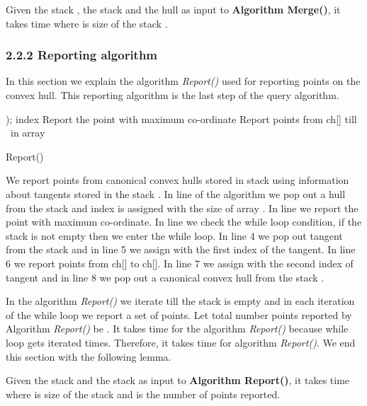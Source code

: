 \documentclass[runningheads,a4paper]{llncs}
\begin{document}
\begin{lemma}\label{lem2}
Given the stack , the stack  and the hull  as input to {\bf Algorithm Merge()}, it takes 
 time where  is size of the stack .
\end{lemma}

\subsubsection{2.2.2  Reporting algorithm}\label{putting}
In this section we explain the algorithm \emph{Report()} used for reporting
points on the convex hull.  This reporting algorithm is the last step of the
query algorithm.
\begin{algorithm}\label{reporting}
);
index \;
Report the point  with maximum  co-ordinate\;
Report points from  ch[] till \ in array \;
\caption{Report()}
\end{algorithm}
\vspace{-0.7cm}
We report points from canonical convex hulls stored in
stack  using information about tangents stored in the stack .
In line  of the algorithm we pop out a hull from the stack  and index 
is assigned with the size of array . In line  we report the point  with maximum  co-ordinate.
In line  we check the while loop condition, if the stack is not empty then we enter the while loop.  In line 4
we pop out tangent  from the stack  and in line 5 we assign  with
the first index  of the tangent.  In line 6 we report points from
ch[] to ch[].  In line 7 we assign  with the second index  of
tangent  and in line 8 we pop out a canonical convex hull from the stack .

In the algorithm \emph{Report()} we iterate till the stack  is empty and in each iteration of the while loop
we report a set of points. Let total number points reported by Algorithm \emph{Report()} be .
It takes  time for the algorithm \emph{Report()} because  while loop gets iterated  times.
Therefore, it takes   time for algorithm \emph{Report()}.
We end this section with the following lemma.
\begin{lemma}\label{lem3}
Given the stack  and the stack  as input to {\bf Algorithm Report()}, it takes 
 time where  is size of the stack  and  is the number of points
reported.
\end{lemma}
\end{document}
